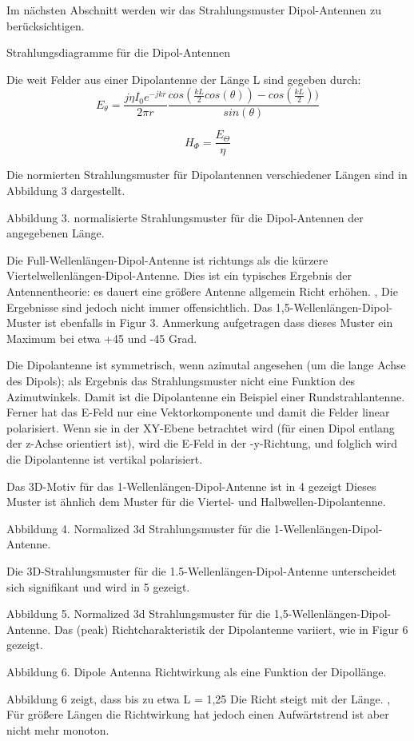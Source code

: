 Im nächsten Abschnitt werden wir das Strahlungsmuster Dipol-Antennen zu berücksichtigen.


Strahlungsdiagramme für die Dipol-Antennen

Die weit Felder aus einer Dipolantenne der Länge L sind gegeben durch:
\[E_{\theta}=\frac{j\eta I_{0} e^{-jkr}}{2\pi r}\frac{cos(\frac{kL}{2}cos(\theta))-cos(\frac{kL}{2}))}{sin(\theta)}\]

\[H_{\Phi}=\frac{E_{\Theta}}{\eta}\]

Die normierten Strahlungsmuster für Dipolantennen verschiedener Längen sind in Abbildung 3 dargestellt.


Abbildung 3. normalisierte Strahlungsmuster für die Dipol-Antennen der angegebenen Länge.

Die Full-Wellenlängen-Dipol-Antenne ist richtungs als die kürzere Viertelwellenlängen-Dipol-Antenne. Dies ist ein typisches Ergebnis der Antennentheorie: es dauert eine größere Antenne allgemein Richt erhöhen. , Die Ergebnisse sind jedoch nicht immer offensichtlich. Das 1,5-Wellenlängen-Dipol-Muster ist ebenfalls in Figur 3. Anmerkung aufgetragen dass dieses Muster ein Maximum bei etwa +45 und -45 Grad.

Die Dipolantenne ist symmetrisch, wenn azimutal angesehen (um die lange Achse des Dipols); als Ergebnis das Strahlungsmuster nicht eine Funktion des Azimutwinkels. Damit ist die Dipolantenne ein Beispiel einer Rundstrahlantenne. Ferner hat das E-Feld nur eine Vektorkomponente und damit die Felder linear polarisiert. Wenn sie in der XY-Ebene betrachtet wird (für einen Dipol entlang der z-Achse orientiert ist), wird die E-Feld in der -y-Richtung, und folglich wird die Dipolantenne ist vertikal polarisiert.

Das 3D-Motiv für das 1-Wellenlängen-Dipol-Antenne ist in 4 gezeigt Dieses Muster ist ähnlich dem Muster für die Viertel- und Halbwellen-Dipolantenne.


Abbildung 4. Normalized 3d Strahlungsmuster für die 1-Wellenlängen-Dipol-Antenne.

Die 3D-Strahlungsmuster für die 1.5-Wellenlängen-Dipol-Antenne unterscheidet sich signifikant und wird in 5 gezeigt.


Abbildung 5. Normalized 3d Strahlungsmuster für die 1,5-Wellenlängen-Dipol-Antenne.
Das (peak) Richtcharakteristik der Dipolantenne variiert, wie in Figur 6 gezeigt.


Abbildung 6. Dipole Antenna Richtwirkung als eine Funktion der Dipollänge.

Abbildung 6 zeigt, dass bis zu etwa L = 1,25 Die Richt steigt mit der Länge. , Für größere Längen die Richtwirkung hat jedoch einen Aufwärtstrend ist aber nicht mehr monoton.

